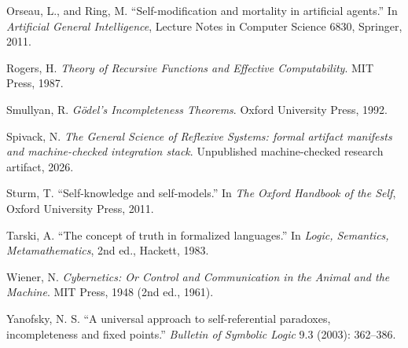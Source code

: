 \documentclass[11pt]{article}
\theoremstyle{plain}
\theoremstyle{definition}
\theoremstyle{remark}
\begin{document}
\medskip
Orseau, L., and Ring, M. ``Self-modification and mortality in artificial agents.'' In \emph{Artificial General Intelligence}, Lecture Notes in Computer Science 6830, Springer, 2011.

\medskip
Rogers, H. \emph{Theory of Recursive Functions and Effective Computability}. MIT Press, 1987.

\medskip
Smullyan, R. \emph{Gödel's Incompleteness Theorems}. Oxford University Press, 1992.

\medskip
Spivack, N. \emph{The General Science of Reflexive Systems: formal artifact manifests and machine-checked integration stack}. Unpublished machine-checked research artifact, 2026.

\medskip
Sturm, T. ``Self-knowledge and self-models.'' In \emph{The Oxford Handbook of the Self}, Oxford University Press, 2011.

\medskip
Tarski, A. ``The concept of truth in formalized languages.'' In \emph{Logic, Semantics, Metamathematics}, 2nd ed., Hackett, 1983.

\medskip
Wiener, N. \emph{Cybernetics: Or Control and Communication in the Animal and the Machine}. MIT Press, 1948 (2nd ed., 1961).

\medskip
Yanofsky, N. S. ``A universal approach to self-referential paradoxes, incompleteness and fixed points.'' \emph{Bulletin of Symbolic Logic} 9.3 (2003): 362--386.
\end{document}
